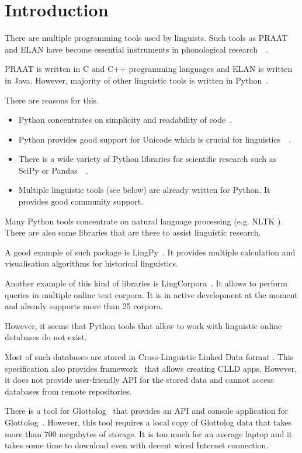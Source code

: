 \documentclass[a4paper,12pt]{article}
\begin{document}
\newpage
\section{Introduction}
There are multiple programming tools used by linguists. Such tools as PRAAT and ELAN have become essential instruments in phonological research~\parencite{praat}~\parencite{elan}.

PRAAT is written in C and C++ programming languages and ELAN is written in Java. However, majority of other linguistic tools is written in Python~\parencite{python}.

There are reasons for this.
\begin{itemize}
 \item Python concentrates on simplicity and readability of code~\parencite{zen}.
 \item Python provides good support for Unicode which is crucial for linguistics~\parencite{unicode}~\parencite{python}.
 \item There is a wide variety of Python libraries for scientific research such as SciPy or Pandas~\parencite{scipy}~\parencite{pandas}.
 \item Multiple linguistic tools (see below) are already written for Python. It provides good community support.
\end{itemize}

Many Python tools concentrate on natural language processing (e.g. NLTK \parencite{NLTK}). There are also some libraries that are there to assist linguistic research.

A good example of such package is LingPy~\parencite{List2017i}. It provides multiple calculation and visualisation algorithms for historical linguistics.

Another example of this kind of libraries is LingCorpora~\parencite{alexey}. It allows to perform queries in multiple online text corpora. It is in active development at the moment and already supports more than 25 corpora.

However, it seems that Python tools that allow to work with linguistic online databases do not exist.

Most of such databases are stored in Cross-Linguistic Linked Data format \parencite{CLLD}. This specification also provides framework~\parencite{RobertForkel2019} that allows creating CLLD apps. However, it does not provide user-friendly API for the stored data and cannot access databases from remote repositories.

There is a tool for Glottolog~\parencite{HaraldHammarstrom2019} that provides an API and console application for Glottolog~\parencite{Robert2Forkel2019}. However, this tool requires a local copy of Glottolog data that takes more than 700 megabytes of storage. It is too much for an average laptop and it takes some time to download even with decent wired Internet connection.
\end{document}
